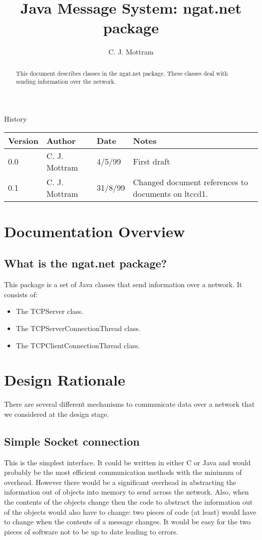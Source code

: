 \documentclass[10pt,a4paper]{article}
\title{Java Message System: ngat.net package}
\author{C. J. Mottram}
\date{}
\begin{document}
\thispagestyle{empty}
\maketitle
\begin{abstract}
This document describes classes in the ngat.net package.
These classes deal with sending information over the network.
\end{abstract}

\centerline{\Large History}
\begin{center}
\begin{tabular}{|l|l|l|p{15em}|}
\hline
{\bf Version} & {\bf Author} & {\bf Date} & {\bf Notes} \\
\hline
0.0 &              C. J. Mottram & 4/5/99 & First draft \\
0.1 &              C. J. Mottram & 31/8/99 & Changed document references to documents on ltccd1.\\
\hline
\end{tabular}
\end{center}

\newpage
\tableofcontents
\listoffigures
\listoftables
\newpage

\section{Documentation Overview}
\subsection{What is the ngat.net package?}
This package is a set of Java classes that send information over a network.
It consists of:
\begin{itemize}
\item The TCPServer class.
\item The TCPServerConnectionThread class.
\item The TCPClientConnectionThread class.
\end{itemize}

\section{Design Rationale}
There are several different mechanisms to communicate data over a network that we considered at the design stage.

\subsection{Simple Socket connection}
This is the simplest interface. It could be written in either C or Java and would probably be the most efficient 
communication methods with the minimum of overhead. However there would be a significant overhead in abstracting 
the information out of objects into memory to send across the network. 
Also, when the contents of the objects change then the code to abstract the information out of the objects would 
also have to change: two pieces of code (at least) would have to change when the contents of a message changes.
It would be easy for the two pieces of software not to be up to date leading to errors.
\end{document}

